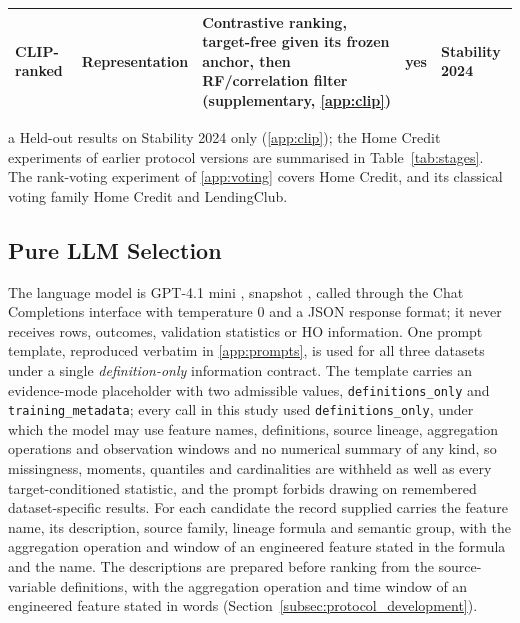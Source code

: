 \documentclass[final,5p,twocolumn]{elsarticle}
\begin{document}
\begin{table}[htbp]
\begin{threeparttable}
\begin{tabular}{@{}llL{46mm}cl@{}}
CLIP-ranked & Representation & Contrastive ranking, target-free given its frozen anchor, then RF/correlation filter (supplementary, \ref{app:clip}) & yes & Stability 2024 \\
\bottomrule
\end{tabular}
\begin{tablenotes}\footnotesize
\item[a] Held-out results on Stability 2024 only (\ref{app:clip}); the Home Credit experiments of earlier protocol versions are summarised in Table~\ref{tab:stages}. The rank-voting experiment of \ref{app:voting} covers Home Credit, and its classical voting family Home Credit and LendingClub.
\end{tablenotes}
\end{threeparttable}
\end{table}

\subsection{Pure LLM Selection}
\label{subsec:llm_fs}

The language model is GPT-4.1 mini \cite{openai2025gpt41}, snapshot , called through the Chat Completions interface with temperature 0 and a JSON response format; it never receives rows, outcomes, validation statistics or HO information. One prompt template, reproduced verbatim in \ref{app:prompts}, is used for all three datasets under a single \emph{definition-only} information contract. The template carries an evidence-mode placeholder with two admissible values, \texttt{definitions\_only} and \texttt{training\_metadata}; every call in this study used \texttt{definitions\_only}, under which the model may use feature names, definitions, source lineage, aggregation operations and observation windows and no numerical summary of any kind, so missingness, moments, quantiles and cardinalities are withheld as well as every target-conditioned statistic, and the prompt forbids drawing on remembered dataset-specific results. For each candidate the record supplied carries the feature name, its description, source family, lineage formula and semantic group, with the aggregation operation and window of an engineered feature stated in the formula and the name. The descriptions are prepared before ranking from the source-variable definitions, with the aggregation operation and time window of an engineered feature stated in words (Section~\ref{subsec:protocol_development}). 
\end{document}
